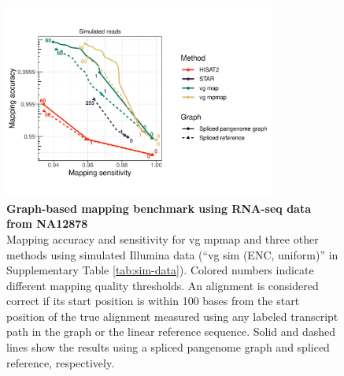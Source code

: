 \documentclass[11pt]{ucthesis}
\begin{document}
\begin{figure}[H]
\begin{center}
\includegraphics[width=0.8\textwidth]{mpmapfigures/figureS2.pdf}
\caption{\textbf{Graph-based mapping benchmark using RNA-seq data from NA12878} \\
Mapping accuracy and sensitivity for vg mpmap and three other methods using simulated Illumina data (``vg sim (ENC, uniform)'' in Supplementary Table \ref{tab:sim-data}). Colored numbers indicate different mapping quality thresholds. An alignment is considered correct if its start position is within 100 bases from the start position of the true alignment measured using any labeled transcript path in the graph or the linear reference sequence. Solid and dashed lines show the results using a spliced pangenome graph and spliced reference, respectively. 
} \label{fig:mapping-gampcompare}
\end{center}
\end{figure}
\end{document}
